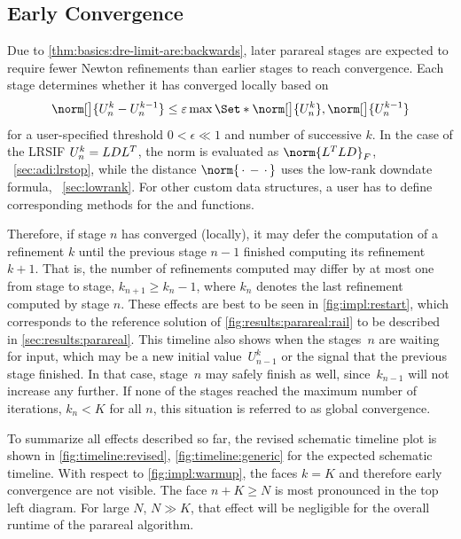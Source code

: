 \subsection{Early Convergence}
\label{sec:impl:pr:conv}

Due to \autoref{thm:basics:dre-limit-are:backwards},
later parareal stages are expected to require fewer Newton refinements than earlier stages to reach convergence.
Each stage determines whether it has converged locally based on
\begin{equation}
\label{eq:impl:pr:conv}
  \norm[\big]{U_n^k - U_n^{k-1}} \leq \epsilon \max\Set*{ \norm[\big]{U_n^k}, \norm[\big]{U_n^{k-1}} }
\end{equation}
for a user-specified threshold $0 < \epsilon \ll 1$
and number of successive $k$.
In the case of the \ac{LRSIF} $U_n^k = LDL^T$,
the norm is evaluated as $\norm{L^\T L D}_F$,
\cf~\autoref{sec:adi:lrstop},
while the distance $\norm{\optional{} - \optional{}}$ uses the low-rank downdate formula,
\cf~\autoref{sec:lowrank}.
For other custom data structures,
a user has to define corresponding methods for the  and  functions.

Therefore, if stage $n$ has converged (locally),
it may defer the computation of a refinement $k$
until the previous stage $n-1$ finished computing its refinement $k+1$.
That is, the number of refinements computed may differ by at most one from stage to stage,
\ie $k_{n+1} \geq k_n -1$,
where $k_n$ denotes the last refinement computed by stage $n$.
These effects are best to be seen in \autoref{fig:impl:restart},
which corresponds to the reference solution of \autoref{fig:results:parareal:rail} to be described in \autoref{sec:results:parareal}.
This timeline also shows when the stages~$n$ are waiting for input,
which may be a new initial value~$U_{n-1}^k$ or the signal that the previous stage finished.
In that case, stage~$n$ may safely finish as well,
since~$k_{n-1}$ will not increase any further.
If none of the stages reached the maximum number of iterations,
\ie $k_n < K$ for all $n$,
this situation is referred to as global convergence.

To summarize all effects described so far,
the revised schematic timeline plot is shown in \autoref{fig:timeline:revised},
\cf \autoref{fig:timeline:generic} for the expected schematic timeline.
With respect to \autoref{fig:impl:warmup},
the faces $k=K$ and therefore early convergence are not visible.
The face $n+K \geq N$ is most pronounced in the top left diagram.
For large $N$, $N \gg K$, that effect will be negligible for the overall runtime of the parareal algorithm.

